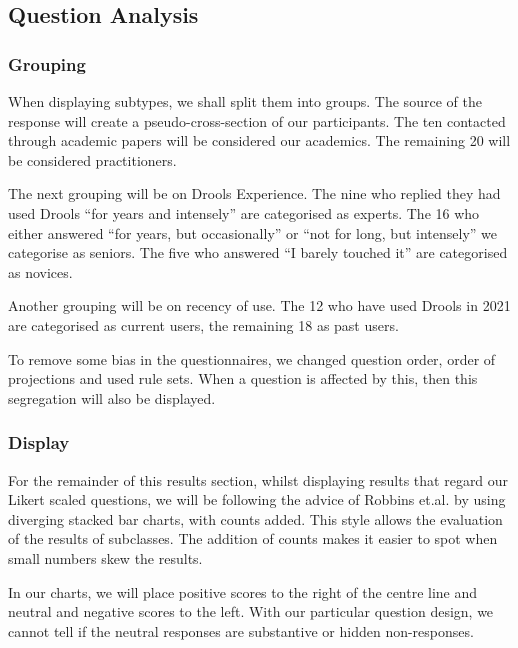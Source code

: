 \subsection{Question Analysis}

\subsubsection{Grouping}
When displaying subtypes, we shall split them into groups.
The source of the response will create a pseudo-cross-section of our participants.
The ten contacted through academic papers will be considered our academics.
The remaining 20 will be considered practitioners.

The next grouping will be on Drools Experience.
The nine who replied they had used Drools ``for years and intensely'' are categorised as experts.
The 16 who either answered ``for years, but occasionally'' or ``not for long, but intensely'' we categorise as seniors.
The five who answered ``I barely touched it'' are categorised as novices.

Another grouping will be on recency of use.
The 12 who have used Drools in 2021 are categorised as current users, the remaining 18 as past users.

To remove some bias in the questionnaires, we changed question order, order of projections and used rule sets.
When a question is affected by this, then this segregation will also be displayed.

\subsubsection{Display}
For the remainder of this results section, whilst displaying results that regard our Likert scaled questions, we will be following the advice of Robbins et.al.\cite{robbins2011plotting} by using diverging stacked bar charts, with counts added.
This style allows the evaluation of the results of subclasses.
The addition of counts makes it easier to spot when small numbers skew the results.

In our charts, we will place positive scores to the right of the centre line and neutral and negative scores to the left.
With our particular question design, we cannot tell if the neutral responses are substantive or hidden non-responses\cite{blasius2001use}.

